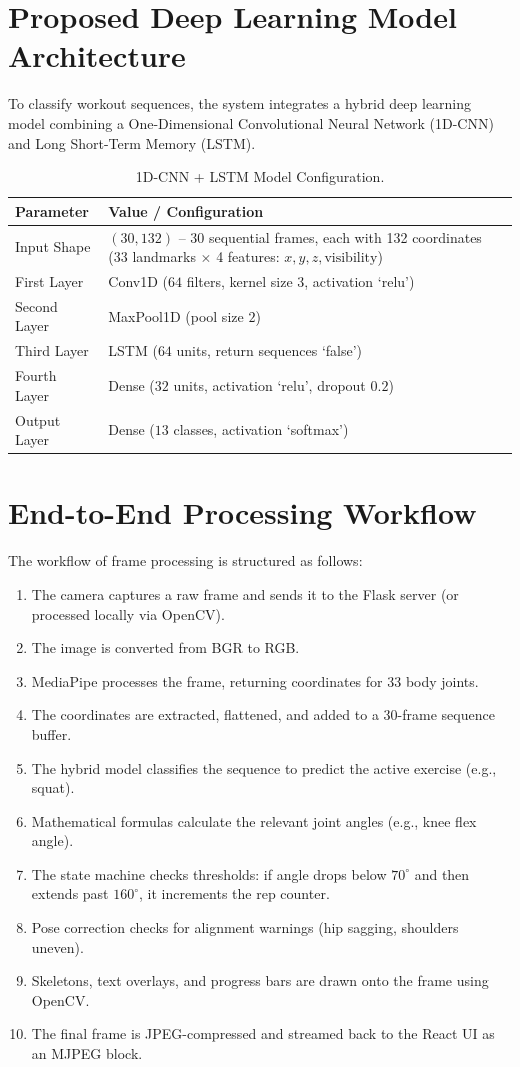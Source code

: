 \section{Proposed Deep Learning Model Architecture}
To classify workout sequences, the system integrates a hybrid deep learning model combining a One-Dimensional Convolutional Neural Network (1D-CNN) and Long Short-Term Memory (LSTM).
\begin{table}[h]
\centering
\begin{tabular}{|p{4.0cm}|p{11.8cm}|}
\hline
\textbf{Parameter} & \textbf{Value / Configuration} \\ \hline
Input Shape & $(30, 132)$ -- 30 sequential frames, each with 132 coordinates (33 landmarks $\times$ 4 features: $x, y, z, \text{visibility}$) \\ \hline
First Layer & Conv1D ($64$ filters, kernel size $3$, activation `relu') \\ \hline
Second Layer & MaxPool1D (pool size $2$) \\ \hline
Third Layer & LSTM ($64$ units, return sequences `false') \\ \hline
Fourth Layer & Dense ($32$ units, activation `relu', dropout $0.2$) \\ \hline
Output Layer & Dense ($13$ classes, activation `softmax') \\ \hline
\end{tabular}
\caption{1D-CNN + LSTM Model Configuration.}
\label{tab:model_config}
\end{table}

\section{End-to-End Processing Workflow}
The workflow of frame processing is structured as follows:
\begin{enumerate}
    \item The camera captures a raw frame and sends it to the Flask server (or processed locally via OpenCV).
    \item The image is converted from BGR to RGB.
    \item MediaPipe processes the frame, returning coordinates for 33 body joints.
    \item The coordinates are extracted, flattened, and added to a 30-frame sequence buffer.
    \item The hybrid model classifies the sequence to predict the active exercise (e.g., squat).
    \item Mathematical formulas calculate the relevant joint angles (e.g., knee flex angle).
    \item The state machine checks thresholds: if angle drops below $70^{\circ}$ and then extends past $160^{\circ}$, it increments the rep counter.
    \item Pose correction checks for alignment warnings (hip sagging, shoulders uneven).
    \item Skeletons, text overlays, and progress bars are drawn onto the frame using OpenCV.
    \item The final frame is JPEG-compressed and streamed back to the React UI as an MJPEG block.
\end{enumerate}

